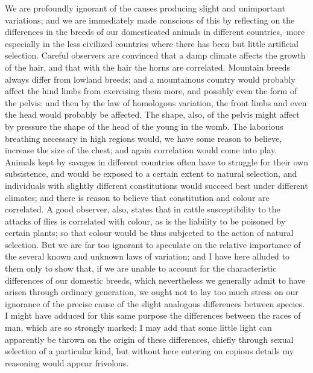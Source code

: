 We are profoundly ignorant of the causes producing slight and unimportant variations; and we are immediately made conscious of this by reflecting on the differences in the breeds of our domesticated animals in different countries,--more especially in the less civilized countries where there has been but little artificial selection. Careful observers are convinced that a damp climate affects the growth of the hair, and that with the hair the horns are correlated. Mountain breeds always differ from lowland breeds; and a mountainous country would probably affect the hind limbs from exercising them more, and possibly even the form of the pelvis; and then by the law of homologous variation, the front limbs and even the head would probably be affected. The shape, also, of the pelvis might affect by pressure the shape of the head of the young in the womb. The laborious breathing necessary in high regions would, we have some reason to believe, increase the size of the chest; and again correlation would come into play. Animals kept by savages in different countries often have to struggle for their own subsistence, and would be exposed to a certain extent to natural selection, and individuals with slightly different constitutions would succeed best under different climates; and there is reason to believe that constitution and colour are correlated. A good observer, also, states that in cattle susceptibility to the attacks of flies is correlated with colour, as is the liability to be poisoned by certain plants; so that colour would be thus subjected to the action of natural selection. But we are far too ignorant to speculate on the relative importance of the several known and unknown laws of variation; and I have here alluded to them only to show that, if we are unable to account for the characteristic differences of our domestic breeds, which nevertheless we generally admit to have arisen through ordinary generation, we ought not to lay too much stress on our ignorance of the precise cause of the slight analogous differences between species. I might have adduced for this same purpose the differences between the races of man, which are so strongly marked; I may add that some little light can apparently be thrown on the origin of these differences, chiefly through sexual selection of a particular kind, but without here entering on copious details my reasoning would appear frivolous.
